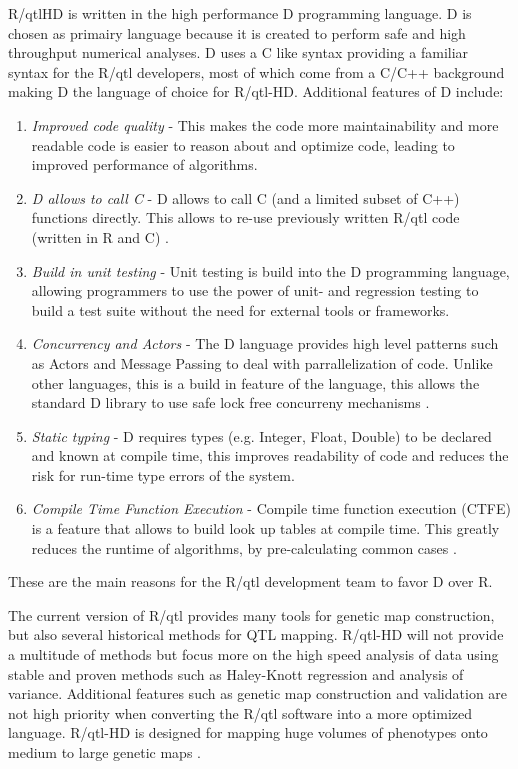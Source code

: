 R/qtlHD is written in the high performance D programming language. D is chosen as primairy 
language because it is created to perform safe and high throughput numerical analyses. D uses 
a C like syntax \cite{Alexandrescu:2011} providing a familiar syntax for the R/qtl developers, 
most of which come from a C/C++ background making D the language of choice for R/qtl-HD. 
Additional features of D include:
\begin{enumerate}\itemsep1pt
\item \emph{Improved code quality} - This makes the code more maintainability and more readable code is 
easier to reason about and optimize code, leading to improved performance of algorithms.
\item \emph{D allows to call C} - D allows to call C (and a limited subset of C++) functions directly. This 
allows to re-use previously written R/qtl code (written in R and C) \cite{RQTLGuide:2009}.
\item \emph{Build in unit testing} - Unit testing is build into the D programming language, allowing 
programmers to use the power of unit- and regression testing to build a test suite without the need 
for external tools or frameworks.
\item \emph{Concurrency and Actors} - The D language provides high level patterns such as Actors and 
Message Passing to deal with parrallelization of code. Unlike other languages, this is a build in 
feature of the language, this allows the standard D library to use safe lock free concurreny mechanisms \cite{Alexandrescu:2011}.
\item \emph{Static typing} - D requires types (e.g. Integer, Float, Double) to be declared and known 
at compile time, this improves readability of code and reduces the risk for run-time type errors of the system.
\item \emph{Compile Time Function Execution} - Compile time function execution (CTFE) is a feature 
that allows to build look up tables at compile time. This greatly reduces the runtime of algorithms, 
by pre-calculating common cases \cite{ArendsBlog:2012}.
\end{enumerate}
These are the main reasons for the R/qtl development team to favor D over R.

The current version of R/qtl provides many tools for genetic map construction, but also several historical 
methods for QTL mapping. R/qtl-HD will not provide a multitude of methods but focus more on the high speed 
analysis of data using stable and proven methods such as Haley-Knott regression \cite{Haley:1992} and analysis of variance.
Additional features such as genetic map construction and validation are not high priority when converting 
the R/qtl software into a more optimized language. R/qtl-HD is designed for mapping huge volumes of phenotypes 
onto medium to large genetic maps \cite{Trelles:2011}.

